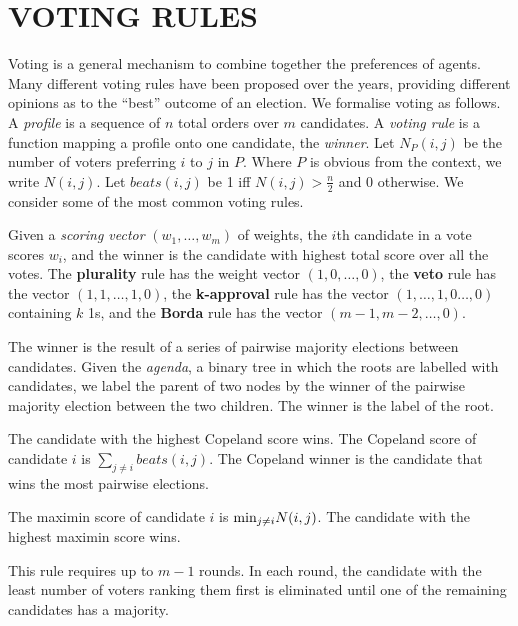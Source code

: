 \documentclass{ecai2012}
\newcommand{\mymin}{\mbox{\rm min}}
\newcommand\lirong[1]{}
\begin{document}
\section{VOTING RULES}

Voting is a general mechanism to combine together
the preferences of agents.
Many different voting rules have been proposed
over the years, providing
different opinions as to the ``best''
outcome of an election. We formalise voting as follows.
A {\em profile} is a sequence of $n$ total orders over $m$ candidates.
A {\em voting rule} is a function mapping a profile
onto one candidate, the {\em winner}.
Let $N_P(i,j)$ be
the number of voters preferring $i$ to $j$ in $P$.
Where $P$ is obvious from the context, we write $N(i,j)$.
Let $beats(i,j)$ be 1 iff $N(i,j) > \frac{n}{2}$
and 0 otherwise.
We consider some of the most common voting rules.

 Given a {\em scoring vector}
$(w_1,\ldots,w_m)$
of weights, the $i$th candidate in a vote
scores $w_i$, and the winner is the candidate with
highest total score over all the votes.
The {\bf plurality} rule has
the weight vector $(1,0,\ldots,0)$,
the {\bf veto} rule has
the vector $(1,1,\ldots,1,0)$,
the {\bf k-approval} rule has
the vector $(1,\ldots,1,0\ldots,0)$
containing $k$ 1s,
and
the {\bf Borda} rule has the vector $(m-1,m-2,\ldots,0)$.

 The winner is the result of a series of pairwise
majority elections between candidates.
Given the \emph{agenda}, a binary tree
in which the roots are labelled with candidates, we label
the parent of two nodes by
the winner of the pairwise majority election between
the two children. The winner is the label of the
root.

 The candidate
with the highest Copeland score wins. The
Copeland score of candidate $i$
is $\sum_{j \neq i} beats(i,j)$.\lirong{I changed it to a more standard definition.}
The Copeland winner is the candidate that wins the
most pairwise elections.

 The maximin score of candidate
$i$ is $\mymin_{j \neq i} N(i,j)$. The candidate with the
highest maximin score wins.

 This rule
requires up to $m-1$ rounds. In each round,
the candidate with the least number of voters ranking
them first is eliminated until one of the remaining candidates
has a majority.
\end{document}
